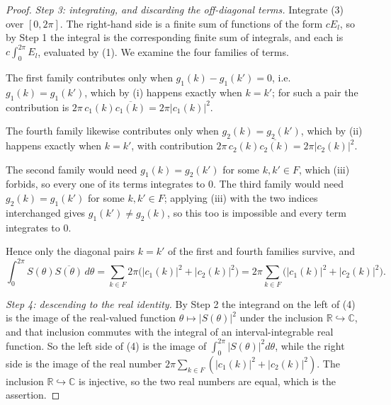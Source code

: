\begin{proof}
\emph{Step 3: integrating, and discarding the off-diagonal terms.}  Integrate
(3) over $[0,2\pi]$.  The right-hand side is a finite sum of functions of the
form $cE_l$, so by Step 1 the integral is the corresponding finite sum of
integrals, and each is $c\int_0^{2\pi}E_l$, evaluated by (1).  We examine the
four families of terms.

The first family contributes only when $g_1(k)-g_1(k')=0$, i.e.
$g_1(k)=g_1(k')$, which by (i) happens exactly when $k=k'$; for such a pair
the contribution is $2\pi\,c_1(k)\overline{c_1(k)}=2\pi|c_1(k)|^{2}$.

The fourth family likewise contributes only when $g_2(k)=g_2(k')$, which by
(ii) happens exactly when $k=k'$, with contribution
$2\pi\,c_2(k)\overline{c_2(k)}=2\pi|c_2(k)|^{2}$.

The second family would need $g_1(k)=g_2(k')$ for some $k,k'\in F$, which (iii)
forbids, so every one of its terms integrates to $0$.  The third family would
need $g_2(k)=g_1(k')$ for some $k,k'\in F$; applying (iii) with the two
indices interchanged gives $g_1(k')\neq g_2(k)$, so this too is impossible and
every term integrates to $0$.

Hence only the diagonal pairs $k=k'$ of the first and fourth families survive,
and
\begin{equation}\tag{4}
  \int_{0}^{2\pi}S(\theta)\overline{S(\theta)}\,d\theta
  =\sum_{k\in F}2\pi\bigl(|c_1(k)|^{2}+|c_2(k)|^{2}\bigr)
  =2\pi\sum_{k\in F}\bigl(|c_1(k)|^{2}+|c_2(k)|^{2}\bigr).
\end{equation}

\emph{Step 4: descending to the real identity.}  By Step 2 the integrand on
the left of (4) is the image of the real-valued function
$\theta\mapsto|S(\theta)|^{2}$ under the inclusion
$\mathbb{R}\hookrightarrow\mathbb{C}$, and that inclusion commutes with the
integral of an interval-integrable real function.  So the left side of (4) is
the image of $\int_{0}^{2\pi}|S(\theta)|^{2}d\theta$, while the right side is
the image of the real number
$2\pi\sum_{k\in F}(|c_1(k)|^{2}+|c_2(k)|^{2})$.  The inclusion
$\mathbb{R}\hookrightarrow\mathbb{C}$ is injective, so the two real numbers are
equal, which is the assertion.
\end{proof}
